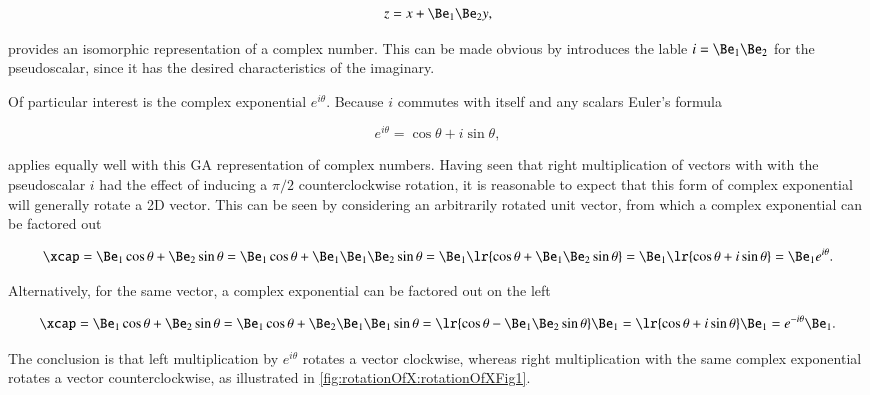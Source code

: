 \begin{dmath}\label{eqn:SimpleProducts2:320}
z = x + \Be_1 \Be_2 y,
\end{dmath}

provides an isomorphic representation of a complex number.  This can be made obvious by introduces the lable \( i = \Be_1 \Be_2 \) for the pseudoscalar, since it has the desired characteristics of the imaginary.

Of particular interest is the complex exponential \( e^{i \theta} \).  Because \( i \) commutes with itself and any scalars Euler's formula

\begin{dmath}\label{eqn:SimpleProducts2:340}
e^{i \theta} = \cos\theta + i \sin\theta,
\end{dmath}

applies equally well with this GA representation of complex numbers.
Having seen that right multiplication of vectors with with the pseudoscalar \( i \) had the effect of inducing a \( \pi/2 \) counterclockwise rotation, it is reasonable to expect that this form of complex exponential will generally rotate a 2D vector.  This can be seen by considering an arbitrarily rotated unit vector, from which a complex exponential can be factored out

\begin{dmath}\label{eqn:SimpleProducts2:940}
\xcap
=
\Be_1 \cos\theta + \Be_2 \sin\theta
=
\Be_1 \cos\theta + \Be_1 \Be_1 \Be_2 \sin\theta
=
\Be_1 \lr{ \cos\theta + \Be_1 \Be_2 \sin\theta }
=
\Be_1 \lr{ \cos\theta + i \sin\theta }
=
\Be_1 e^{i\theta}.
\end{dmath}

Alternatively, for the same vector, a complex exponential can be factored out on the left

\begin{dmath}\label{eqn:SimpleProducts2:960}
\xcap
=
\Be_1 \cos\theta + \Be_2 \sin\theta
=
\Be_1 \cos\theta + \Be_2 \Be_1 \Be_1 \sin\theta
=
\lr{ \cos\theta - \Be_1 \Be_2 \sin\theta } \Be_1
=
\lr{ \cos\theta + i \sin\theta } \Be_1
=
e^{-i\theta} \Be_1.
\end{dmath}

The conclusion is that left multiplication by \( e^{i\theta} \) rotates a vector clockwise, whereas right multiplication with the same complex exponential rotates a vector counterclockwise, as
illustrated in \cref{fig:rotationOfX:rotationOfXFig1}.

